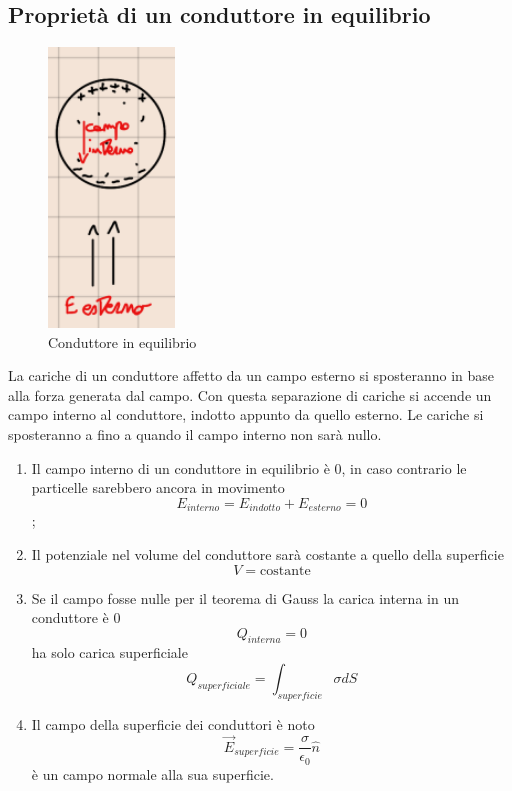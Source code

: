 \documentclass[a4paper, 12pt]{book}
\theoremstyle{plain}
\begin{document}
\subsection{Proprietà di un conduttore in equilibrio}
\begin{figure}
    \includegraphics[width=0.3\textwidth]{conduttore.png}
    \caption{Conduttore in equilibrio}
\end{figure}

La  cariche di un conduttore affetto da un campo esterno si 
sposteranno in base alla forza generata dal campo. Con questa separazione
di cariche si accende un campo interno al conduttore, indotto appunto da quello esterno.
Le cariche si sposteranno a fino a quando il campo interno non sarà nullo.

\begin{enumerate}
    \item Il campo interno di un conduttore in equilibrio è $0$, in caso contrario le particelle sarebbero ancora in movimento\[{E_{interno}} = {E_{indotto}} + {E_{esterno}} = 0\];
    \item Il potenziale nel volume del conduttore sarà costante a quello della superficie \[V = \textrm{costante}\]
    \item Se il campo fosse nulle per il teorema di Gauss la carica interna in un conduttore è $0$ \[Q_{interna} = 0\]ha solo carica superficiale \[Q_{superficiale} = \int_{superficie} \sigma dS\]
    \item Il campo della superficie dei conduttori è noto \[\vec{E}_{superficie} = \frac{\sigma}{\epsilon_0}\hat{n}\] è un campo normale alla sua superficie.
\end{enumerate}
\end{document}

